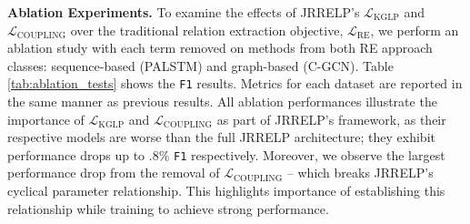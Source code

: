 % 



\textbf{Ablation Experiments.}
To examine the effects of JRRELP's $\mathcal{L}_\text{KGLP}$ and $\mathcal{L}_{\text{COUPLING}}$ over the traditional relation extraction objective, $\mathcal{L}_{\text{RE}}$, we perform an ablation study with each term removed on methods from both RE approach classes: sequence-based (PALSTM) and graph-based (C-GCN). Table \ref{tab:ablation_tests} shows the \texttt{F1} results. Metrics for each dataset are reported in the same manner as previous results. 
All ablation performances illustrate the importance of $\mathcal{L}_\text{KGLP}$ and $\mathcal{L}_{\text{COUPLING}}$ as part of JRRELP's framework, as their respective models are worse than the full JRRELP architecture; they exhibit performance drops up to $.8\%$ \texttt{F1} respectively. Moreover, we observe the largest performance drop from the removal of $\mathcal{L}_\text{COUPLING}$ -- which breaks JRRELP's cyclical parameter relationship. This highlights importance of establishing this relationship while training to achieve strong performance.



